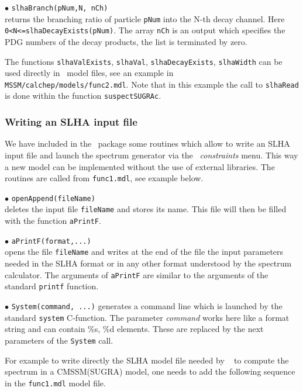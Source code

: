 \documentclass[12pt,a4paper]{article}
\begin{document}
\noindent
$\bullet$ \verb|slhaBranch(pNum,N, nCh)|\\
returns the  branching ratio of  particle \verb|pNum| into the N-th decay channel. Here\\
\noindent \verb|0<N<=slhaDecayExists(pNum)|.
The array \verb|nCh| is an output which specifies the  PDG numbers of the decay products, the list  
is terminated by zero.

The functions \verb|slhaValExists|, \verb|slhaVal|, 
\verb|slhaDecayExists|, \verb|slhaWidth| can be used directly 
in \calchep\ model files, see an example in \\
\verb|MSSM/calchep/models/func2.mdl|. Note that in this example the 
call to \verb|slhaRead| is done within the function \verb|suspectSUGRAc|.


\subsubsection{Writing an SLHA input file}
We have included in the \micro\ package some routines which allow to write
an SLHA input file and launch the spectrum generator via the \calchep\ 
{\it constraints} menu.  This way a new model can be implemented without the use of
external libraries. The routines are called from \verb|func1.mdl|, see example below.

\noindent
$\bullet$ \verb|openAppend(fileName)|\\
deletes the input file \verb|fileName| and stores its name. This file will then be filled with
the function \verb|aPrintF|.

\noindent
$\bullet$ \verb|aPrintF(format,...)|\\
opens the file \verb|fileName| and writes at the end of the file the input parameters needed in the SLHA format or in any other format
understood by the spectrum calculator.  The arguments of 
\verb|aPrintF| are similar to the arguments of the standard \verb|printf| function.

\noindent
$\bullet$ \verb|System(command, ...)|  
generates a command line which is launched by the standard \verb|system|
C-function. The parameter {\it command} works here like a format string and can contain \%s, \%d elements. 
These are replaced by the next parameters  of the \verb|System|  call.

For example to write directly the SLHA model file needed by \suspect~ to compute 
the spectrum in a CMSSM(SUGRA) model, one needs to add the following sequence in the \verb|func1.mdl| model file.
\end{document}
